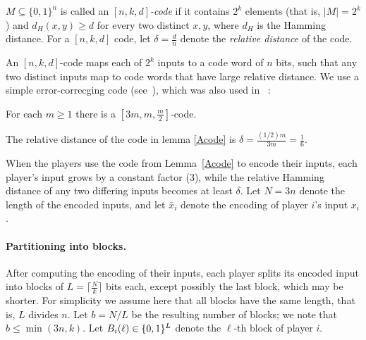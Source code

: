 				\begin{definition}
					$M \subseteq \{0,1\}^n$ is called an \emph{$[n,k,d]$-code} if it contains $2^k$ elements (that is, $|M| = 2^k$) and $d_H(x,y) \geq d$ for every two distinct $x,y$, where $d_H$ is the Hamming distance.
					For a $[n,k,d]$ code, let $\delta=\frac{d}{n}$ denote the \emph{relative distance} of the code.
				\end{definition}
				An $[n,k,d]$-code maps each of $2^k$ inputs to a code word of $n$ bits,
				such that any two distinct inputs map to code words that have large relative distance.
				We use a simple error-correcging code (see~\cite{MWS81}), which was also used in ~\cite{Amb96}:
				\begin{lemma}
					\label{Acode}
					For each $m \geq 1$ there is a $[3m,m,\frac{m}{2}]$-code.
				\end{lemma}
				The relative distance of the code in lemma \ref{Acode} is $\delta = \frac{(1/2)m}{3m} = \frac{1}{6}$.

				When the players use the code from Lemma~\ref{Acode} to encode their inputs, each player's
				input grows by a constant factor (3), while the relative Hamming distance of any two differing inputs becomes
				at least $\delta$.
				Let $N = 3n$ denote the length of the encoded inputs,
				and let $\bar{x}_i$ denote the encoding of player $i$'s input $x_i$.
		
				\paragraph{Partitioning into blocks.}
				After computing the encoding of their inputs, 
				each player splits its encoded input into blocks of $L = \lceil\frac{N}{k}\rceil$ bits each,
				except possibly the last block, which may be shorter. For simplicity we assume here that all blocks have the same length, that is, $L$ divides $n$.
				Let $b = N/L$ be the resulting number of blocks; we note that $b \leq \min(3n,k)$.
				Let $B_i(\ell) \in \{ 0,1 \}^L$ denote the $\ell$-th block of player $i$.
		
